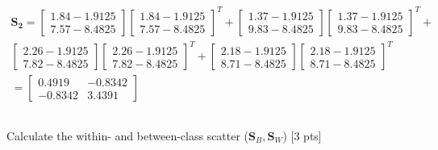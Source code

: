 \documentclass{homework}
\begin{document}
\begin{equation*}
\begin{gathered}
        \\[8pt]
        \mathbf{S_2} = \begin{bmatrix} 1.84 - 1.9125 \\ 7.57 - 8.4825 \end{bmatrix}
        \begin{bmatrix} 1.84 - 1.9125 \\ 7.57 - 8.4825 \end{bmatrix}^T + 
        \begin{bmatrix} 1.37 - 1.9125 \\ 9.83 - 8.4825 \end{bmatrix}
        \begin{bmatrix} 1.37 - 1.9125 \\ 9.83 - 8.4825 \end{bmatrix}^T + \\
        \begin{bmatrix} 2.26 - 1.9125 \\ 7.82 - 8.4825 \end{bmatrix}
        \begin{bmatrix} 2.26 - 1.9125 \\ 7.82 - 8.4825 \end{bmatrix}^T
        + \begin{bmatrix} 2.18 - 1.9125 \\ 8.71 - 8.4825 \end{bmatrix}
        \begin{bmatrix} 2.18 - 1.9125 \\ 8.71 - 8.4825 \end{bmatrix}^T\\[5pt]
        = \begin{bmatrix} 0.4919 & -0.8342 \\ -0.8342 & 3.4391  \end{bmatrix}
        
        \end{gathered}
    \end{equation*}
    
    \subsection{}
    Calculate the within- and between-class scatter ($\mathbf{S}_{B},\mathbf{S}_{W}$) [3 pts]
\end{document}
